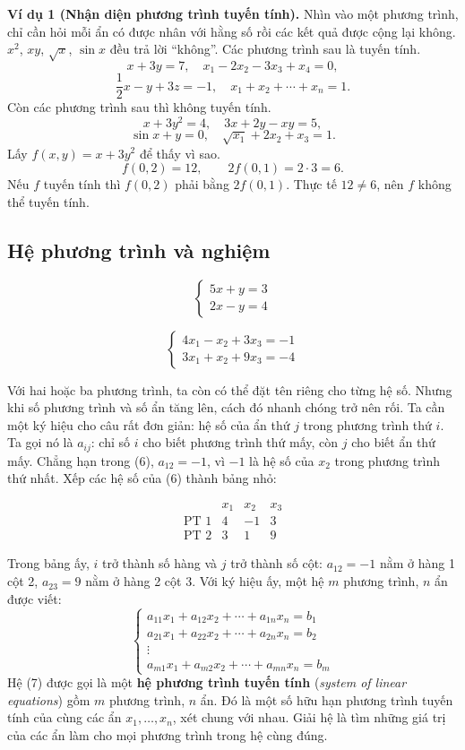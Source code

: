 \documentclass[12pt,a4paper]{article}
\begin{document}
\textbf{Ví dụ 1 (Nhận diện phương trình tuyến tính).} Nhìn vào một phương trình, chỉ cần hỏi mỗi ẩn có được nhân với hằng số rồi các kết quả được cộng lại không. \(x^2\), \(xy\), \(\sqrt{x}\), \(\sin x\) đều trả lời ``không''. Các phương trình sau là tuyến tính.
$$
x + 3y = 7, \quad x_1 - 2x_2 - 3x_3 + x_4 = 0,
$$
$$
\frac{1}{2}x - y + 3z = -1, \quad x_1 + x_2 + \cdots + x_n = 1.
$$
Còn các phương trình sau thì không tuyến tính.
$$
x + 3y^2 = 4, \quad 3x + 2y - xy = 5,
$$
$$
\sin x + y = 0, \quad \sqrt{x_1} + 2x_2 + x_3 = 1.
$$
Lấy \(f(x,y)=x+3y^2\) để thấy vì sao.
$$ f(0,2)=12,\qquad 2f(0,1)=2\cdot 3=6. $$
Nếu \(f\) tuyến tính thì \(f(0,2)\) phải bằng \(2f(0,1)\). Thực tế \(12\neq 6\), nên \(f\) không thể tuyến tính.

\subsection{Hệ phương trình và nghiệm}

$$
\begin{cases} 5x + y = 3 \\ 2x - y = 4 \end{cases} \tag{5}
$$

$$
\begin{cases}
4x_1 - x_2 + 3x_3 = -1 \\
3x_1 + x_2 + 9x_3 = -4
\end{cases} \tag{6}
$$

Với hai hoặc ba phương trình, ta còn có thể đặt tên riêng cho từng hệ số. Nhưng khi số phương trình và số ẩn tăng lên, cách đó nhanh chóng trở nên rối. Ta cần một ký hiệu cho câu rất đơn giản: hệ số của ẩn thứ \(j\) trong phương trình thứ \(i\). Ta gọi nó là \(a_{ij}\): chỉ số \(i\) cho biết phương trình thứ mấy, còn \(j\) cho biết ẩn thứ mấy. Chẳng hạn trong (6), \(a_{12}=-1\), vì \(-1\) là hệ số của \(x_2\) trong phương trình thứ nhất. Xếp các hệ số của (6) thành bảng nhỏ:

$$ \begin{array}{c|ccc} & x_1 & x_2 & x_3\\ \hline \text{PT 1} & 4 & -1 & 3\\ \text{PT 2} & 3 & 1 & 9 \end{array} $$

Trong bảng ấy, \(i\) trở thành số hàng và \(j\) trở thành số cột: \(a_{12}=-1\) nằm ở hàng 1 cột 2, \(a_{23}=9\) nằm ở hàng 2 cột 3. Với ký hiệu ấy, một hệ \(m\) phương trình, \(n\) ẩn được viết:
$$
\begin{cases}
a_{11}x_1 + a_{12}x_2 + \cdots + a_{1n}x_n = b_1 \\
a_{21}x_1 + a_{22}x_2 + \cdots + a_{2n}x_n = b_2 \\
\vdots \\
a_{m1}x_1 + a_{m2}x_2 + \cdots + a_{mn}x_n = b_m
\end{cases} \tag{7}
$$
Hệ (7) được gọi là một \textbf{hệ phương trình tuyến tính} (\emph{system of linear equations}) gồm \(m\) phương trình, \(n\) ẩn. Đó là một số hữu hạn phương trình tuyến tính của cùng các ẩn \(x_1,\ldots,x_n\), xét chung với nhau. Giải hệ là tìm những giá trị của các ẩn làm cho mọi phương trình trong hệ cùng đúng.
\end{document}

